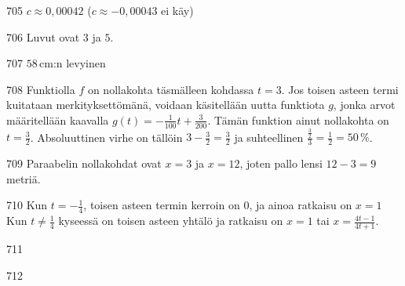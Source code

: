 \begin{Vastaus}{705}
	$c\approx 0,00042$ ($c \approx -0,00043$ ei käy)
	
\end{Vastaus}
\begin{Vastaus}{706}
		Luvut ovat $3$ ja $5$.
    
\end{Vastaus}
\begin{Vastaus}{707}
		$58$\,cm:n levyinen
    
\end{Vastaus}
\begin{Vastaus}{708}
Funktiolla $f$ on nollakohta täsmälleen kohdassa $t=3$. Jos toisen asteen termi kuitataan merkityksettömänä, voidaan käsitellään uutta funktiota $g$, jonka arvot määritellään kaavalla $g(t)=-\frac{1}{100}t+\frac{3}{200}$. Tämän funktion ainut nollakohta on $t=\frac{3}{2}$. Absoluuttinen virhe on tällöin $3-\frac{3}{2}=\frac{3}{2}$ ja suhteellinen $\frac{\frac{3}{2}}{3}=\frac{1}{2}=50\,\%$.
    
\end{Vastaus}
\begin{Vastaus}{709}
		Paraabelin nollakohdat ovat $x=3$ ja $x=12$, joten pallo lensi $12-3 = 9$ metriä.
	
\end{Vastaus}
\begin{Vastaus}{710}
		Kun $t=-\frac{1}{4}$, toisen asteen termin kerroin on $0$, ja ainoa ratkaisu on $x = 1$  \\
		Kun $t \neq \frac{1}{4}$ kyseessä on toisen asteen yhtälö ja ratkaisu on $x= 1$ tai $x=\frac{4t-1}{4t+1}$.
    
\end{Vastaus}
\begin{Vastaus}{711}
	
\end{Vastaus}
\begin{Vastaus}{712}
    
\end{Vastaus}

